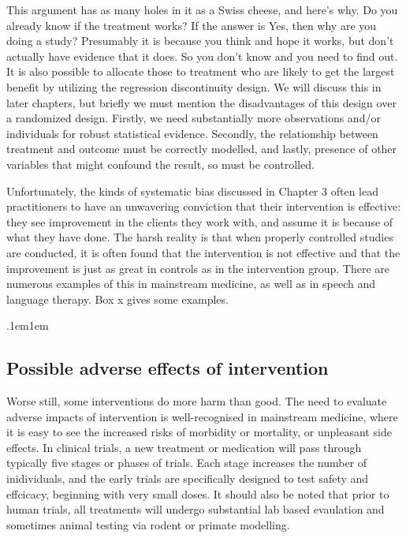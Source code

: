 \documentclass[]{book}
\begin{document}
This argument has as many holes in it as a Swiss cheese, and here's why. Do you already know if the treatment works? If the answer is Yes, then why are you doing a study? Presumably it is because you think and hope it works, but don't actually have evidence that it does. So you don't know and you need to find out.
It is also possible to allocate those to treatment who are likely to get the largest benefit by utilizing the regression discontinuity design. We will discuss this in later chapters, but briefly we must mention the disadvantages of this design over a randomized design. Firstly, we need substantially more observations and/or individuals for robust statistical evidence. Secondly, the relationship between treatment and outcome must be correctly modelled, and lastly, presence of other variables that might confound the result, so must be controlled.

Unfortunately, the kinds of systematic bias discussed in Chapter 3 often lead practitioners to have an unwavering conviction that their intervention is effective: they see improvement in the clients they work with, and assume it is because of what they have done. The harsh reality is that when properly controlled studies are conducted, it is often found that the intervention is not effective and that the improvement is just as great in controls as in the intervention group. There are numerous examples of this in mainstream medicine, as well as in speech and language therapy. Box x gives some examples.

\sffamily\fboxrule.1em\fboxsep1em

\hypertarget{possible-adverse-effects-of-intervention}{%
\subsection{Possible adverse effects of intervention}\label{possible-adverse-effects-of-intervention}}

Worse still, some interventions do more harm than good. The need to evaluate adverse impacts of intervention is well-recognised in mainstream medicine, where it is easy to see the increased risks of morbidity or mortality, or unpleasant side effects. In clinical trials, a new treatment or medication will pass through typically five stages or phases of trials. Each stage increases the number of inidividuals, and the early trials are specifically designed to test safety and effcicacy, beginning with very small doses. It should also be noted that prior to human trials, all treatments will undergo substantial lab based evaulation and sometimes animal testing via rodent or primate modelling.
\end{document}
